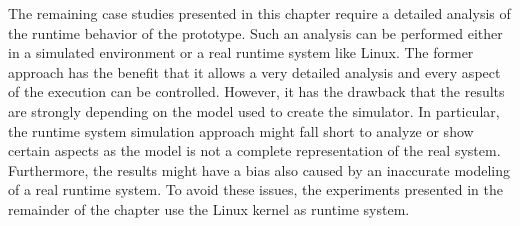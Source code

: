 The remaining case studies presented in this chapter require a detailed analysis of the runtime behavior of the \cobas{} prototype. Such an analysis can be performed either in a simulated environment or a real runtime system like \eg{} Linux. The former approach has the benefit that it allows a very detailed analysis and every aspect of the execution can be controlled. However, it has the drawback that the results are strongly depending on the model used to create the simulator. In particular, the runtime system simulation approach might fall short to analyze or show certain aspects as the model is not a complete representation of the real system. Furthermore, the results might have a bias also caused by an inaccurate modeling of a real runtime system. To avoid these issues, the experiments presented in the remainder of the chapter use the Linux kernel as runtime system.


